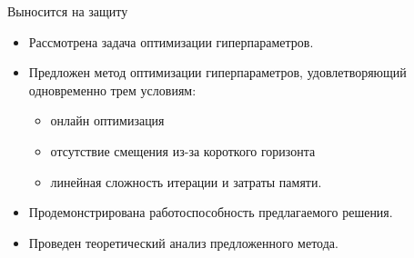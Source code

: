 \documentclass[aspectratio=169]{beamer}
\begin{document}
\begin{frame}{Выносится на защиту}
    \begin{itemize}
      \item Рассмотрена задача оптимизации гиперпараметров.
      \item Предложен метод оптимизации гиперпараметров, удовлетворяющий одновременно трем условиям:
      \begin{itemize}
        \item онлайн оптимизация
        \item отсутствие смещения из-за короткого горизонта
        \item линейная сложность итерации и затраты памяти.
      \end{itemize}
      \item Продемонстрирована работоспособность предлагаемого решения.
      \item Проведен теоретический анализ предложенного метода.
    \end{itemize}
\end{frame}
\end{document}
